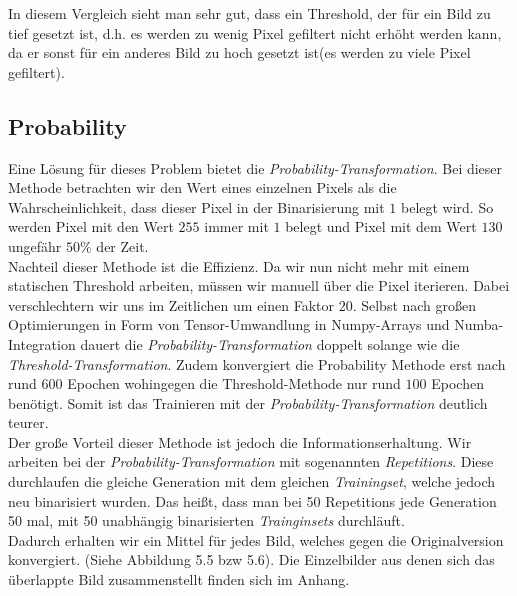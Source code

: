In diesem Vergleich sieht man sehr gut, dass ein Threshold, der für ein Bild zu tief gesetzt ist, d.h. es werden zu wenig Pixel gefiltert nicht erhöht werden kann, da er sonst für ein anderes Bild zu hoch gesetzt ist(es werden zu viele Pixel gefiltert).\\

\subsection{Probability}

Eine Lösung für dieses Problem bietet die \textit{Probability-Transformation}. Bei dieser Methode betrachten wir den Wert eines einzelnen Pixels als die Wahrscheinlichkeit, dass dieser Pixel in der Binarisierung mit $1$ belegt wird. So werden Pixel mit den Wert $255$ immer mit $1$ belegt und Pixel mit dem Wert $130$ ungefähr $50\%$ der Zeit.\\

Nachteil dieser Methode ist die Effizienz. Da wir nun nicht mehr mit einem statischen Threshold arbeiten, müssen wir manuell über die Pixel iterieren. Dabei verschlechtern wir uns im Zeitlichen um einen Faktor $20$. Selbst nach großen Optimierungen in Form von Tensor-Umwandlung in Numpy-Arrays und Numba-Integration dauert die \textit{Probability-Transformation} doppelt solange wie die \textit{Threshold-Transformation}. Zudem konvergiert die Probability Methode erst nach rund $600$ Epochen wohingegen die Threshold-Methode nur rund $100$ Epochen benötigt. Somit ist das Trainieren mit der \textit{Probability-Transformation} deutlich teurer.\\

Der große Vorteil dieser Methode ist jedoch die Informationserhaltung. Wir arbeiten bei der \textit{Probability-Transformation} mit sogenannten \textit{Repetitions}. Diese durchlaufen die gleiche Generation mit dem gleichen \textit{Trainingset}, welche jedoch neu binarisiert wurden. Das heißt, dass man bei 50 Repetitions jede Generation 50 mal, mit 50 unabhängig binarisierten \textit{Trainginsets} durchläuft.\\Dadurch erhalten wir ein Mittel für jedes Bild, welches gegen die Originalversion konvergiert. (Siehe Abbildung 5.5 bzw 5.6). Die Einzelbilder aus denen sich das überlappte Bild zusammenstellt finden sich im Anhang.

